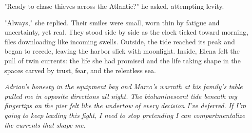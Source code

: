 "Ready to chase thieves across the Atlantic?" he asked, attempting levity.

"Always," she replied. Their smiles were small, worn thin by fatigue and uncertainty, yet real. They stood side by side as the clock ticked toward morning, files downloading like incoming swells. Outside, the tide reached its peak and began to recede, leaving the harbor slick with moonlight. Inside, Elena felt the pull of twin currents: the life she had promised and the life taking shape in the spaces carved by trust, fear, and the relentless sea.


\noindent\textit{Adrian's honesty in the equipment bay and Marco's warmth at his family's table pulled me in opposite directions all night. The bioluminescent tide beneath my fingertips on the pier felt like the undertow of every decision I've deferred. If I'm going to keep leading this fight, I need to stop pretending I can compartmentalize the currents that shape me.}
